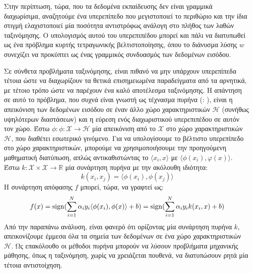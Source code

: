 Στην περίπτωση, τώρα, που τα δεδομένα εκπαίδευσης δεν είναι γραμμικά διαχωρίσιμα, αναζητούμε ένα υπερεπίπεδο που μεγιστοποιεί το περιθώριο και την ίδια στιγμή ελαχιστοποιεί μία ποσότητα αντιστρόφως ανάλογη στο πλήθος των λαθών ταξινόμησης.
Ο υπολογισμός αυτού του υπερεπιπέδου μπορεί και πάλι να διατυπωθεί ως ένα πρόβλημα κυρτής τετραγωνικής βελτιστοποίησης, όπου το διάνυσμα λύσης $w$ συνεχίζει να προκύπτει ως ένας γραμμικός συνδυασμός των δεδομένων εισόδου.\par
Σε σύνθετα προβλήματα ταξινόμησης, είναι πιθανό να μην υπάρχουν υπερεπίπεδα τέτοια ώστε να διαχωρίζουν τα θετικά επισημειωμένα παραδείγματα από τα αρνητικά, με τέτοιο τρόπο ώστε να παρέχουν ένα καλό αποτέλεσμα ταξινόμησης.
Η απάντηση σε αυτό το πρόβλημα, που συχνά είναι γνωστή ως τέχνασμα πυρήνα (: \cite{Aizerman67theoretical, Boser1992}), είναι η απεικόνιση των δεδομένων εισόδου σε έναν άλλο χώρο χαρακτηριστικών $\mathcal{H}$ (συνήθως υψηλότερων διαστάσεων) και η εύρεση ενός διαχωριστικού υπερεπιπέδου σε αυτόν τον χώρο.
Έστω $\phi : \mathcal{\phi} : \mathcal{X} \rightarrow \mathcal{H}$ μία απεικόνιση από το $\mathcal{X}$ στο χώρο χαρακτηριστικών $\mathcal{H}$, που διαθέτει εσωτερικό γινόμενο.
Για να υπολογίσουμε το βέλτιστο υπερεπίπεδο στο χώρο χαρακτηριστικών, μπορούμε να χρησιμοποιήσουμε την προηγούμενη μαθηματική διατύπωση, απλώς αντικαθιστώντας το $\langle x_{i} , x \rangle$ με $\langle \phi(x_{i}), φ(x) \rangle$.
Έστω $k : \mathcal{X} \times \mathcal{X} \rightarrow \mathbb{R}$ μία συνάρτηση πυρήνα με την ακόλουθη ιδιότητα:
\begin{equation}
k(x_{i}, x_{j}) = \langle \phi (x_{i}), \phi (x_{j}) \rangle    
\end{equation}
Η συνάρτηση απόφασης $f$ μπορεί, τώρα, να γραφτεί ως:
\begin{equation}
f(x) = \operatorname{sign}(\sum_{i=1}^{N}\alpha_{i} y_{i} \langle \phi(x_{i}), \phi(x) \rangle + b ) = \operatorname{sign}(\sum_{i=1}^{N}\alpha_{i}y_{i} k(x_{i}, x) + b)
\end{equation}
Από την παραπάνω ανάλυση, είναι φανερό ότι ορίζοντας μία συνάρτηση πυρήνα $k$, απεικονίζουμε έμμεσα όλα τα σημεία των δεδομένων σε ένα χώρο χαρακτηριστικών $\mathcal{H}$. 
Ως επακόλουθο οι μέθοδοι πυρήνα μπορούν να λύσουν προβλήματα μηχανικής μάθησης, όπως η ταξινόμηση, χωρίς να χρειάζεται πουθενά, να διατυπώσουν ρητά μία τέτοια αντιστοίχηση.

